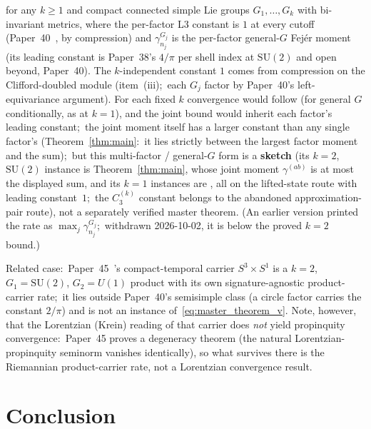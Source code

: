 \documentclass[11pt,a4paper]{article}
\theoremstyle{plain}
\theoremstyle{definition}
\newcommand{\sthree}{S^{3}}
\newcommand{\SU}{\mathrm{SU}}
\begin{document}
for any $k \ge 1$ and compact connected simple Lie groups
$G_{1}, \ldots, G_{k}$ with bi-invariant metrics, where
the per-factor L3 constant is $1$ at every cutoff (Paper~40~\cite{paper40_unified},
by compression) and
$\gamma^{G_{j}}_{n_{j}}$ is the per-factor general-$G$ Fej\'er moment
(its leading constant is Paper~38's $4/\pi$ per shell index at
$\SU(2)$ and open beyond, Paper~40). The
$k$-independent constant $1$ comes from compression on the
Clifford-doubled module (item~(iii);\ each $G_j$ factor by
Paper~40's left-equivariance argument). For each fixed $k$ convergence
would follow (for general $G$ conditionally, as at $k = 1$), and the joint
bound would inherit each factor's leading constant;\ the joint moment itself has a larger constant than any single
factor's (Theorem~\ref{thm:main}:\ it lies strictly between the largest
factor moment and the sum);\ but this multi-factor /
general-$G$ form is a \textbf{sketch} (its $k=2$, $\SU(2)$ instance is
Theorem~\ref{thm:main}, whose joint moment $\gamma^{(ab)}$ is at most the
displayed sum, and its $k=1$ instances are \cite{loutey_paper38,
paper40_unified}, all on the lifted-state route with leading
constant~$1$;\ the $C_3^{(k)}$ constant belongs to the abandoned
approximation-pair route), not a separately verified master theorem. (An
earlier version printed the rate as $\max_j\gamma^{G_j}_{n_j}$;\ withdrawn
2026-10-02, it is below the proved $k = 2$ bound.)

Related case:\ Paper~45~\cite{paper45}'s compact-temporal carrier
$\sthree \times S^{1}$ is a $k = 2$, $G_{1} = \SU(2)$, $G_{2} = U(1)$
product with its own signature-agnostic product-carrier rate;\ it lies
outside Paper~40's semisimple class (a circle factor carries the constant
$2/\pi$) and is not an instance of~\eqref{eq:master_theorem_v}. Note,
however, that the Lorentzian (Krein) reading of that carrier does
\emph{not} yield propinquity convergence:\ Paper~45 proves a degeneracy
theorem (the natural Lorentzian-propinquity seminorm vanishes
identically), so what survives there is the Riemannian product-carrier
rate, not a Lorentzian convergence result.

\section{Conclusion}\label{sec:conclusion}
\end{document}
